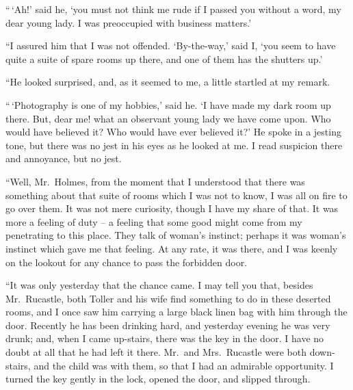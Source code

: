 “\,‘Ah!’ said he, ‘you must not think me rude if I passed
you without a word, my dear young lady. I was preoccupied
with business matters.’

“I assured him that I was not offended. ‘By-the-way,’ said
I, ‘you seem to have quite a suite of spare rooms up there,
and one of them has the shutters up.’

“He looked surprised, and, as it seemed to me, a little
startled at my remark.

“\,‘Photography is one of my hobbies,’ said he. ‘I have
made my dark room up there. But, dear me! what an observant
young lady we have come upon. Who would have believed
it? Who would have ever believed it?’ He spoke in
a jesting tone, but there was no jest in his eyes as he looked
at me. I read suspicion there and annoyance, but no jest.

“Well, Mr.~Holmes, from the moment that I understood
that there was something about that suite of rooms which I
was not to know, I was all on fire to go over them. It was not
mere curiosity, though I have my share of that. It was more
a feeling of duty -- a feeling that some good might come from
my penetrating to this place. They talk of woman’s instinct;
perhaps it was woman’s instinct which gave me that feeling.
At any rate, it was there, and I was keenly on the lookout
for any chance to pass the forbidden door.

“It was only yesterday that the chance came. I may tell
you that, besides Mr.~Rucastle, both Toller and his wife find
something to do in these deserted rooms, and I once saw him
carrying a large black linen bag with him through the door.
Recently he has been drinking hard, and yesterday evening
he was very drunk; and, when I came up-stairs, there was the
key in the door. I have no doubt at all that he had left it
there. Mr.~and Mrs.~Rucastle were both down-stairs, and the
child was with them, so that I had an admirable opportunity.
I turned the key gently in the lock, opened the door, and
slipped through.

